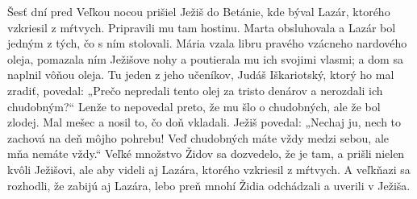 Šesť dní pred Veľkou nocou prišiel Ježiš do Betánie, kde býval Lazár, ktorého vzkriesil z mŕtvych. 
Pripravili mu tam hostinu. Marta obsluhovala a Lazár bol jedným z tých, čo s ním stolovali.
Mária vzala libru pravého vzácneho nardového oleja, pomazala ním Ježišove nohy a poutierala mu ich svojimi vlasmi; a dom sa naplnil vôňou oleja.
Tu jeden z jeho učeníkov, Judáš Iškariotský, ktorý ho mal zradiť, povedal:
„Prečo nepredali tento olej za tristo denárov a nerozdali ich chudobným?“ 
Lenže to nepovedal preto, že mu šlo o chudobných, ale že bol zlodej. Mal mešec a nosil to, čo doň vkladali.
Ježiš povedal: „Nechaj ju, nech to zachová na deň môjho pohrebu!
Veď chudobných máte vždy medzi sebou, ale mňa nemáte vždy.“
Veľké množstvo Židov sa dozvedelo, že je tam, a prišli nielen kvôli Ježišovi, ale aby videli aj Lazára, ktorého vzkriesil z mŕtvych. 
A veľkňazi sa rozhodli, že zabijú aj Lazára, lebo preň mnohí Židia odchádzali a uverili v Ježiša. 